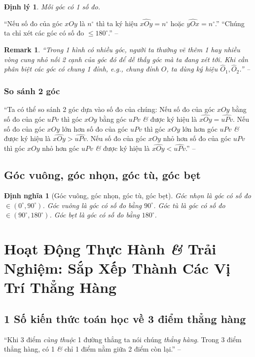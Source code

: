 \documentclass[oneside]{book}
\numberwithin{equation}{section}
\newtheorem{dinhnghia}{Định nghĩa}[section]
\newtheorem{remark}{Remark}[section]
\newtheorem{dinhly}{Định lý}[section]
\begin{document}
\begin{dinhly}
	Mỗi góc có 1 số đo.
\end{dinhly}
``Nếu số đo của góc $xOy$ là $n^\circ$ thì ta ký hiệu $\widehat{xOy} = n^\circ$ hoặc $\widehat{yOx} = n^\circ$.'' ``Chúng ta chỉ xét các góc có số đo $\le 180^\circ$.'' -- \cite[p. 96]{Thai_Anh_Dat_Ha_Loan_Nam_Quang_Toan_6_tap_2}

\begin{remark}
	``Trong 1 hình có nhiều góc, người ta thường vẽ thêm 1 hay nhiều vòng cung nhỏ nối 2 cạnh của góc đó để dễ thấy góc mà ta đang xét tới. Khi cần phân biệt các góc có chung 1 đỉnh, e.g., chung đỉnh $O$, ta dùng ký hiệu $\widehat{O}_1,\widehat{O}_2$.'' -- \cite[p. 98]{Thai_Anh_Dat_Ha_Loan_Nam_Quang_Toan_6_tap_2}
\end{remark}

\subsubsection{So sánh 2 góc}
``Ta có thể so sánh 2 góc dựa vào số đo của chúng: Nếu số đo của góc $xOy$ bằng số đo của góc $uPv$ thì góc $xOy$ bằng góc $uPv$ \textit{\&} được ký hiệu là $\widehat{xOy} = \widehat{uPv}$. Nếu số đo của góc $xOy$ lớn hơn số đo của góc $uPv$ thì góc $xOy$ lớn hơn góc $uPv$ \textit{\&} được ký hiệu là $\widehat{xOy} > \widehat{uPv}$. Nếu số đo của góc $xOy$ nhỏ hơn số đo của góc $uPv$ thì góc $xOy$ nhỏ hơn góc $uPv$ \textit{\&} được ký hiệu là $\widehat{xOy} < \widehat{uPv}$.'' -- \cite[p. 98]{Thai_Anh_Dat_Ha_Loan_Nam_Quang_Toan_6_tap_2}

\subsection{Góc vuông, góc nhọn, góc tù, góc bẹt}

\begin{dinhnghia}[Góc vuông, góc nhọn, góc tù, góc bẹt]
	\emph{Góc nhọn} là góc có số đo $\in(0^\circ,90^\circ)$. \emph{Góc vuông} là góc có số đo bằng $90^\circ$. \emph{Góc tù} là góc có số đo $\in(90^\circ,180^\circ)$. \emph{Góc bẹt} là góc có số đo bằng $180^\circ$.
\end{dinhnghia}

\section{Hoạt Động Thực Hành \textit{\&} Trải Nghiệm: Sắp Xếp Thành Các Vị Trí Thẳng Hàng}

\subsection{1 Số kiến thức toán học về 3 điểm thẳng hàng}
``Khi 3 điểm \textit{cùng thuộc} 1 đường thẳng ta nói chúng \textit{thẳng hàng}. Trong 3 điểm thẳng hàng, có 1 \textit{\&} chỉ 1 điểm nằm giữa 2 điểm còn lại.'' -- \cite[p. 104]{Thai_Anh_Dat_Ha_Loan_Nam_Quang_Toan_6_tap_2}
\end{document}
